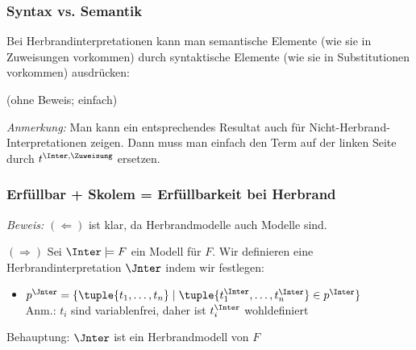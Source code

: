 \documentclass[aspectratio=1610,onlymath]{beamer}
\begin{document}
\begin{frame}\frametitle{Syntax vs. Semantik}

Bei Herbrandinterpretationen kann man semantische Elemente (wie sie in Zuweisungen vorkommen) durch syntaktische Elemente (wie sie in Substitutionen vorkommen) ausdrücken:\medskip


(ohne Beweis; einfach)
\bigskip

{\color{devilscss}\footnotesize \emph{Anmerkung:} Man kann ein entsprechendes Resultat auch für Nicht-Herbrand-Interpretationen zeigen. Dann muss man einfach den Term auf der linken Seite durch $t^{\Inter,\Zuweisung}$ ersetzen.}

\end{frame}

\begin{frame}\frametitle{Erfüllbar + Skolem = Erfüllbarkeit bei Herbrand}

\pause

\emph{Beweis:} $(\Leftarrow)$ ist klar, da Herbrandmodelle auch Modelle sind.\bigskip\pause

$(\Rightarrow)$ Sei $\Inter\models F$ ein Modell für $F$. Wir definieren eine Herbrandinterpretation $\Jnter$ indem wir festlegen:
\begin{itemize}
\item $p^\Jnter=\{\tuple{t_1,\ldots,t_n}\mid\tuple{t_1^\Inter,\ldots,t_n^\Inter}\in p^\Inter\}$\\
{\footnotesize Anm.: $t_i$ sind variablenfrei, daher ist $t_i^\Inter$ wohldefiniert}
\end{itemize}
Behauptung: \alert{$\Jnter$ ist ein Herbrandmodell von $F$}

\end{frame}
\end{document}
